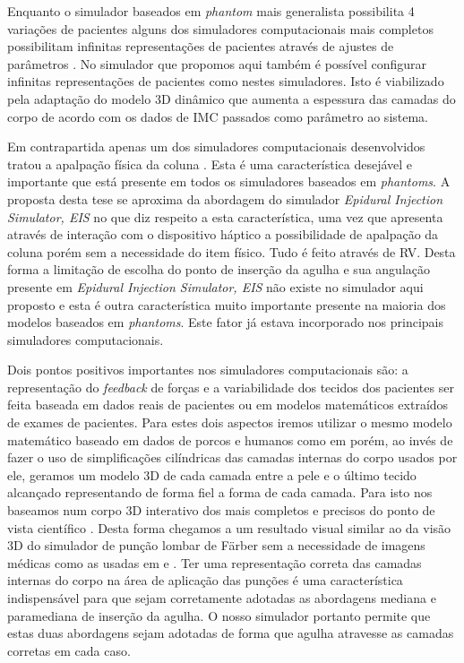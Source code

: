 Enquanto o simulador baseados em \textit{phantom} mais generalista possibilita 4 variações de pacientes alguns dos simuladores computacionais mais completos possibilitam infinitas representações de pacientes através de ajustes de parâmetros \cite{Stredney1996, Wilson2003, YantricInc2011, Brazil2017}. No simulador que propomos aqui também é possível configurar infinitas representações de pacientes como nestes simuladores. Isto é viabilizado pela adaptação do modelo 3D dinâmico que aumenta a espessura das camadas do corpo de acordo com os dados de \acrshort{IMC} passados como parâmetro ao sistema.  

Em contrapartida apenas um dos simuladores computacionais desenvolvidos tratou a apalpação física da coluna \cite{Wilson2003}. Esta é uma característica desejável e importante que está presente em todos os simuladores baseados em \textit{phantoms}. A proposta desta tese se aproxima da abordagem do simulador \textit{Epidural Injection Simulator, EIS} \cite{Wilson2003} no que diz respeito a esta característica, uma vez que apresenta através de interação com o dispositivo háptico a possibilidade de apalpação da coluna porém sem a necessidade do item físico. Tudo é feito através de \acrshort{RV}. Desta forma a limitação de escolha do ponto de inserção da agulha e sua angulação presente em \textit{Epidural Injection Simulator, EIS} não existe no simulador aqui proposto e esta é outra característica muito importante presente na maioria dos modelos baseados em \textit{phantoms}. Este fator já estava incorporado nos principais simuladores computacionais.

Dois pontos positivos importantes nos simuladores computacionais são: a representação do \textit{feedback} de forças e a variabilidade dos tecidos dos pacientes ser feita baseada em dados reais de pacientes ou em modelos matemáticos extraídos de exames de pacientes. Para estes dois aspectos iremos utilizar o mesmo modelo matemático baseado em dados de porcos e humanos como em \textcite{Brazil2017} porém, ao invés de fazer o uso de simplificações cilíndricas das camadas internas do corpo usados por ele, geramos um modelo 3D de cada camada entre a pele e o último tecido alcançado representando de forma fiel a forma de cada camada. Para isto nos baseamos num corpo 3D interativo dos mais completos e precisos do ponto de vista científico \cite{BioDigitalInc2019}. Desta forma chegamos a um resultado visual similar ao da visão 3D do simulador de punção lombar de Färber sem a necessidade de imagens médicas como as usadas em \textcite{Farber2009} e \textcite{Dreifaldt2006}. Ter uma representação correta das camadas internas do corpo na área de aplicação das punções é uma característica indispensável para que sejam corretamente adotadas as abordagens mediana e paramediana de inserção da agulha. O nosso simulador portanto permite que estas duas abordagens sejam adotadas de forma que agulha atravesse as camadas corretas em cada caso. 


